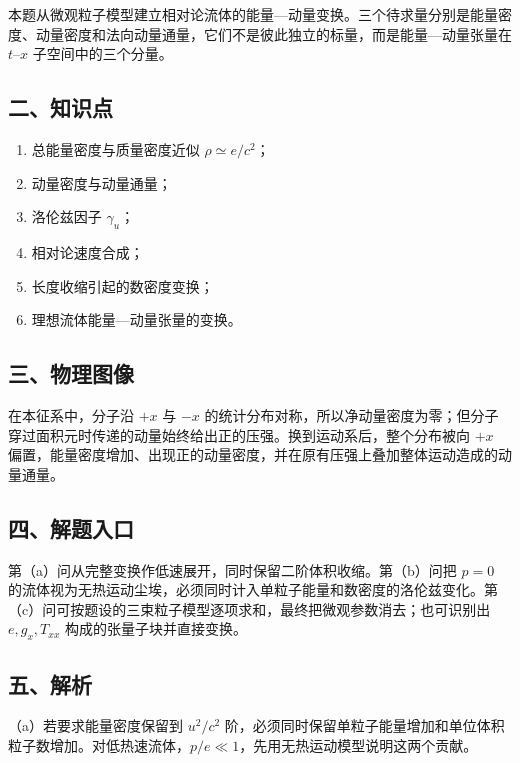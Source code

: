 \documentclass[12pt,a4paper,UTF8]{ctexart}
\newcommand{\tightlist}{\setlength{\itemsep}{0pt}\setlength{\parskip}{0pt}}
\begin{document}
本题从微观粒子模型建立相对论流体的能量---动量变换。三个待求量分别是能量密度、动量密度和法向动量通量，它们不是彼此独立的标量，而是能量---动量张量在
\(t\)--\(x\) 子空间中的三个分量。

\subsection{二、知识点}\label{ux4e8cux77e5ux8bc6ux70b9-7}

\begin{enumerate}
\def\labelenumi{\arabic{enumi}.}
\tightlist
\item
  总能量密度与质量密度近似 \(\rho\simeq e/c^2\)；
\item
  动量密度与动量通量；
\item
  洛伦兹因子 \(\gamma_u\)；
\item
  相对论速度合成；
\item
  长度收缩引起的数密度变换；
\item
  理想流体能量---动量张量的变换。
\end{enumerate}

\subsection{三、物理图像}\label{ux4e09ux7269ux7406ux56feux50cf-7}

在本征系中，分子沿 \(+x\) 与 \(-x\)
的统计分布对称，所以净动量密度为零；但分子穿过面积元时传递的动量始终给出正的压强。换到运动系后，整个分布被向
\(+x\)
偏置，能量密度增加、出现正的动量密度，并在原有压强上叠加整体运动造成的动量通量。

\subsection{四、解题入口}\label{ux56dbux89e3ux9898ux5165ux53e3-7}

第（a）问从完整变换作低速展开，同时保留二阶体积收缩。第（b）问把 \(p=0\)
的流体视为无热运动尘埃，必须同时计入单粒子能量和数密度的洛伦兹变化。第（c）问可按题设的三束粒子模型逐项求和，最终把微观参数消去；也可识别出
\(e,g_x,T_{xx}\) 构成的张量子块并直接变换。

\subsection{五、解析}\label{ux4e94ux89e3ux6790-7}

（a）若要求能量密度保留到 \(u^2/c^2\)
阶，必须同时保留单粒子能量增加和单位体积粒子数增加。对低热速流体，\(p/e\ll1\)，先用无热运动模型说明这两个贡献。
\end{document}
